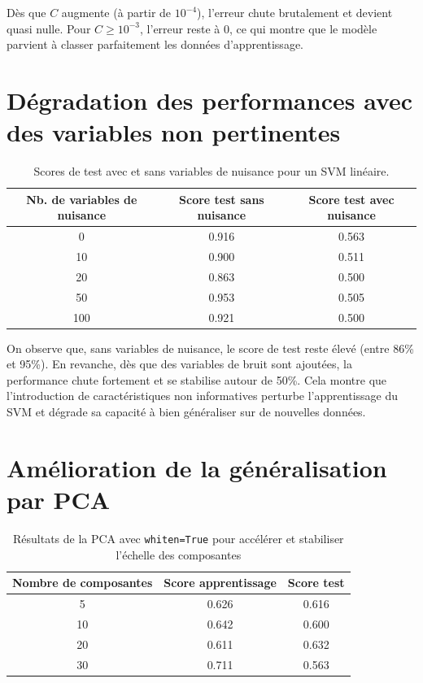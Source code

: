 \documentclass{rapport}
\begin{document}
Dès que $C$ augmente (à partir de $10^{-4}$), l’erreur chute brutalement et devient quasi nulle. Pour $C \geq 10^{-3}$, l’erreur reste à 0, ce qui montre que le modèle parvient à classer parfaitement les données d’apprentissage.

\section{Dégradation des performances avec des variables non pertinentes}

\begin{table}[H]
\centering
\begin{tabular}{|c|c|c|}
\hline
\textbf{Nb. de variables de nuisance} & \textbf{Score test sans nuisance} & \textbf{Score test avec nuisance} \\ \hline
0   & 0.916 & 0.563 \\ \hline
10  & 0.900 & 0.511 \\ \hline
20  & 0.863 & 0.500 \\ \hline
50  & 0.953 & 0.505 \\ \hline
100 & 0.921 & 0.500 \\ \hline
\end{tabular}
\caption{Scores de test avec et sans variables de nuisance pour un SVM linéaire.}
\label{tab:svm_nuisance}
\end{table}

On observe que, sans variables de nuisance, le score de test reste élevé (entre 86\% et 95\%). 
En revanche, dès que des variables de bruit sont ajoutées, la performance chute fortement et se stabilise autour de 50\%. 
Cela montre que l’introduction de caractéristiques non informatives perturbe l’apprentissage du SVM 
et dégrade sa capacité à bien généraliser sur de nouvelles données.


\section{Amélioration de la généralisation par PCA }

\begin{table}[H]
\centering

\begin{tabular}{|c|c|c|}
\hline
\textbf{Nombre de composantes} & \textbf{Score apprentissage} & \textbf{Score test} \\
\hline
5  & 0.626 & 0.616 \\ \hline
10 & 0.642 & 0.600 \\ \hline
20 & 0.611 & 0.632 \\ \hline
30 & 0.711 & 0.563 \\
\hline
\end{tabular}
\label{tab:pca_svm}
\caption{Résultats de la PCA avec \texttt{whiten=True} pour accélérer et stabiliser l’échelle des composantes}
\end{table}
\end{document}
